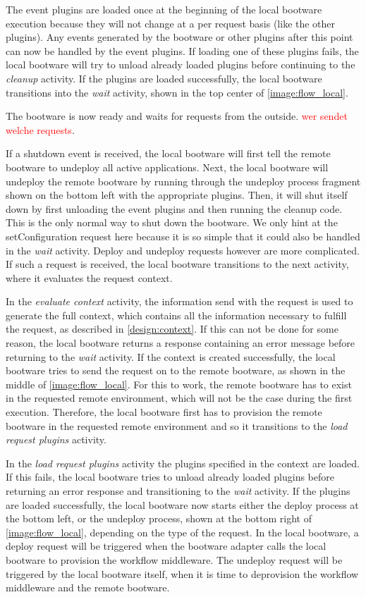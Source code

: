 The event plugins are loaded once at the beginning of the local bootware execution because they will not change at a per request basis (like the other plugins).
Any events generated by the bootware or other plugins after this point can now be handled by the event plugins.
If loading one of these plugins fails, the local bootware will try to unload already loaded plugins before continuing to the \textit{cleanup} activity.
If the plugins are loaded successfully, the local bootware transitions into the \textit{wait} activity, shown in the top center of \autoref{image:flow_local}.


The bootware is now ready and waits for requests from the outside.
\textcolor{red}{wer sendet welche requests}.

If a shutdown event is received, the local bootware will first tell the remote bootware to undeploy all active applications.
Next, the local bootware will undeploy the remote bootware by running through the undeploy process fragment shown on the bottom left with the appropriate plugins.
Then, it will shut itself down by first unloading the event plugins and then running the cleanup code.
This is the only normal way to shut down the bootware.
We only hint at the setConfiguration request here because it is so simple that it could also be handled in the \textit{wait} activity.
Deploy and undeploy requests however are more complicated.
If such a request is received, the local bootware transitions to the next activity, where it evaluates the request context.

In the \textit{evaluate context} activity, the information send with the request is used to generate the full context, which contains all the information necessary to fulfill the request, as described in \autoref{design:context}.
If this can not be done for some reason, the local bootware returns a response containing an error message before returning to the \textit{wait} activity.
If the context is created successfully, the local bootware tries to send the request on to the remote bootware, as shown in the middle of \autoref{image:flow_local}.
For this to work, the remote bootware has to exist in the requested remote environment, which will not be the case during the first execution.
Therefore, the local bootware first has to provision the remote bootware in the requested remote environment and so it transitions to the \textit{load request plugins} activity.

In the \textit{load request plugins} activity the plugins specified in the context are loaded.
If this fails, the local bootware tries to unload already loaded plugins before returning an error response and transitioning to the \textit{wait} activity.
If the plugins are loaded successfully, the local bootware now starts either the deploy process at the bottom left, or the undeploy process, shown at the bottom right of \autoref{image:flow_local}, depending on the type of the request.
In the local bootware, a deploy request will be triggered when the bootware adapter calls the local bootware to provision the workflow middleware.
The undeploy request will be triggered by the local bootware itself, when it is time to deprovision the workflow middleware and the remote bootware.

